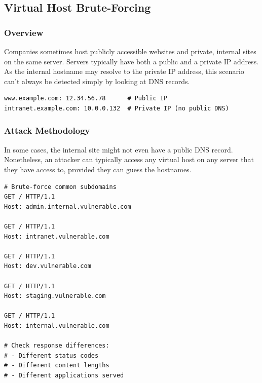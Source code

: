 \documentclass[12pt,a4paper]{article}
\begin{document}
\subsection{Virtual Host Brute-Forcing}

\subsubsection{Overview}
Companies sometimes host publicly accessible websites and private, internal sites on the same server. Servers typically have both a public and a private IP address. As the internal hostname may resolve to the private IP address, this scenario can't always be detected simply by looking at DNS records.

\begin{lstlisting}[caption=Public vs Private IP Example]
www.example.com: 12.34.56.78      # Public IP
intranet.example.com: 10.0.0.132  # Private IP (no public DNS)
\end{lstlisting}

\subsubsection{Attack Methodology}
In some cases, the internal site might not even have a public DNS record. Nonetheless, an attacker can typically access any virtual host on any server that they have access to, provided they can guess the hostnames.

\begin{lstlisting}[caption=Virtual Host Brute-Forcing]
# Brute-force common subdomains
GET / HTTP/1.1
Host: admin.internal.vulnerable.com

GET / HTTP/1.1
Host: intranet.vulnerable.com

GET / HTTP/1.1
Host: dev.vulnerable.com

GET / HTTP/1.1
Host: staging.vulnerable.com

GET / HTTP/1.1
Host: internal.vulnerable.com

# Check response differences:
# - Different status codes
# - Different content lengths
# - Different applications served
\end{lstlisting}

\end{document}
